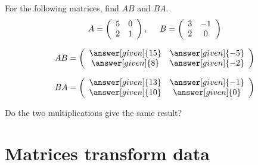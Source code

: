 \documentclass{ximera}
\begin{document}
\begin{question}
For the following matrices, find $AB$ and $BA$.
\[
A= \left(\begin{array}{cc}
5 & 0 \\
2 & 1
\end{array}\right), \hspace{.5cm} B = \left(\begin{array}{cc}
3 & -1 \\
2 & 0
\end{array}\right)
\]
\begin{prompt}
\[
AB = \left(\begin{array}{cc}
\answer[given]{15} & \answer[given]{-5}\\
\answer[given]{8} & \answer[given]{-2}
\end{array}\right)\]

\[BA = \left(\begin{array}{cc}
\answer[given]{13} & \answer[given]{-1}\\
\answer[given]{10} & \answer[given]{0}
\end{array}\right)\]
\end{prompt}
Do the two multiplications give the same result? 
\end{question}











\section{Matrices transform data}
\end{document}
